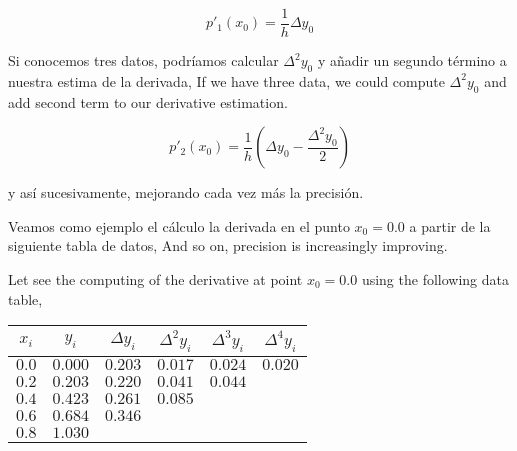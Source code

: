 \begin{equation*}
p'_1(x_0)=\frac{1}{h}\Delta y_0
\end{equation*}
\begin{paracol}{2}
Si conocemos tres datos, podríamos calcular $\Delta^2y_0$ y añadir un segundo término a nuestra estima de la derivada,
\switchcolumn
If we have three data, we could compute $\Delta^2y_0$ and add second term to our derivative estimation.
\end{paracol}
\begin{equation*}
p'_2(x_0)=\frac{1}{h}\left(\Delta y_0-\frac{\Delta^2 y_0}{2}\right)
\end{equation*}
\begin{paracol}{2}
y así sucesivamente, mejorando cada vez más la precisión.

Veamos como ejemplo el cálculo la derivada en el punto $x_0=0.0$ a partir de la siguiente tabla de datos,
\switchcolumn
And so on, precision is increasingly improving.

Let see the computing of the derivative at point $x_0 =0.0$ using the following data table,
\end{paracol}
\begin{table}[h]
\centering
\begin{tabular}{cccccc}
$x_i$&$y_i$&$\Delta y_i$&$\Delta^2 y_i$&$\Delta^3 y_i$ & $\Delta^4 y_i$\\
\hline
$0.0$& $0.000$& $0.203$ &$0.017$ &$0.024$ &$0.020$\\
$0.2$ &$0.203$ &$0.220$ &$0.041$ &$0.044$\\
$0.4$ &$0.423$ &$0.261$ &$0.085$\\
$0.6$ &$0.684$ &$0.346$\\
$0.8$ &$1.030$\\
\end{tabular}
\end{table} 

